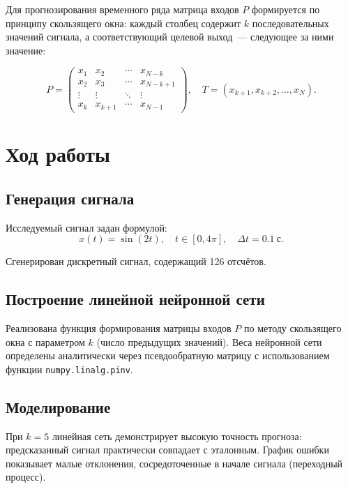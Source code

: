\documentclass[14pt,a4paper]{extarticle}
\begin{document}
Для прогнозирования временного ряда матрица входов $P$ формируется по принципу скользящего окна: каждый столбец содержит $k$ последовательных значений сигнала, а соответствующий целевой выход~--- следующее за ними значение:

\begin{equation}
P = \begin{pmatrix}
x_1 & x_2 & \cdots & x_{N-k} \\
x_2 & x_3 & \cdots & x_{N-k+1} \\
\vdots & \vdots & \ddots & \vdots \\
x_k & x_{k+1} & \cdots & x_{N-1}
\end{pmatrix}, \quad
T = (x_{k+1}, x_{k+2}, \ldots, x_N).
\end{equation}

\section{Ход работы}

\subsection{Генерация сигнала}

Исследуемый сигнал задан формулой:
\begin{equation}
x(t) = \sin(2t), \quad t \in [0, 4\pi], \quad \Delta t = 0.1~\text{с}.
\end{equation}

Сгенерирован дискретный сигнал, содержащий 126 отсчётов.

\subsection{Построение линейной нейронной сети}

Реализована функция формирования матрицы входов $P$ по методу скользящего окна с параметром $k$ (число предыдущих значений). Веса нейронной сети определены аналитически через псевдообратную матрицу с использованием функции \texttt{numpy.linalg.pinv}.

\subsection{Моделирование}

При $k = 5$ линейная сеть демонстрирует высокую точность прогноза: предсказанный сигнал практически совпадает с эталонным. График ошибки показывает малые отклонения, сосредоточенные в начале сигнала (переходный процесс).
\end{document}
